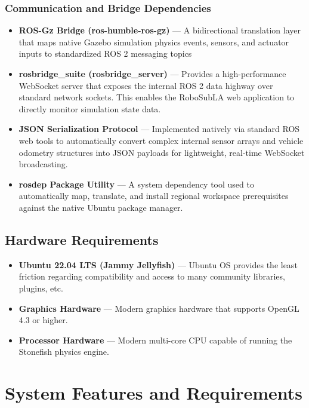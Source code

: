 \documentclass[12pt]{article}
\begin{document}
\subsubsection{Communication and Bridge Dependencies} 
\begin{itemize} 
	\item \textbf{ROS-Gz Bridge (ros-humble-ros-gz)} — A bidirectional translation layer that maps native Gazebo simulation physics events, sensors, and actuator inputs to standardized ROS 2 messaging topics
	\item \textbf{rosbridge\_suite (rosbridge\_server)} — Provides a high-performance WebSocket server that exposes the internal ROS 2 data highway over standard network sockets. This enables the RoboSubLA web application to directly monitor simulation state data.
	\item \textbf{JSON Serialization Protocol} — Implemented natively via standard ROS web tools to automatically convert complex internal sensor arrays and vehicle odometry structures into JSON payloads for lightweight, real-time WebSocket broadcasting.
	\item \textbf{rosdep Package Utility}  — A system dependency tool used to automatically map, translate, and install regional workspace prerequisites against the native Ubuntu package manager.
\end{itemize} 

\subsection{Hardware Requirements} 
\begin{itemize} 
	\item \textbf{Ubuntu 22.04 LTS (Jammy Jellyfish)} — Ubuntu OS provides the least friction regarding compatibility and access to many community libraries, plugins, etc. 
	\item \textbf{Graphics Hardware} — Modern graphics hardware that supports OpenGL 4.3 or higher. 
	\item \textbf{Processor Hardware} — Modern multi-core CPU capable of running the Stonefish physics engine. 
\end{itemize} 

\newpage 
\section{System Features and Requirements} 
\end{document}
